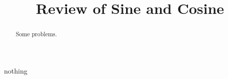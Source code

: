 \documentclass{ximera}
\title{Review of Sine and Cosine}
\begin{document}
\begin{abstract}
Some problems.
\end{abstract}
\maketitle



nothing
\end{document}
